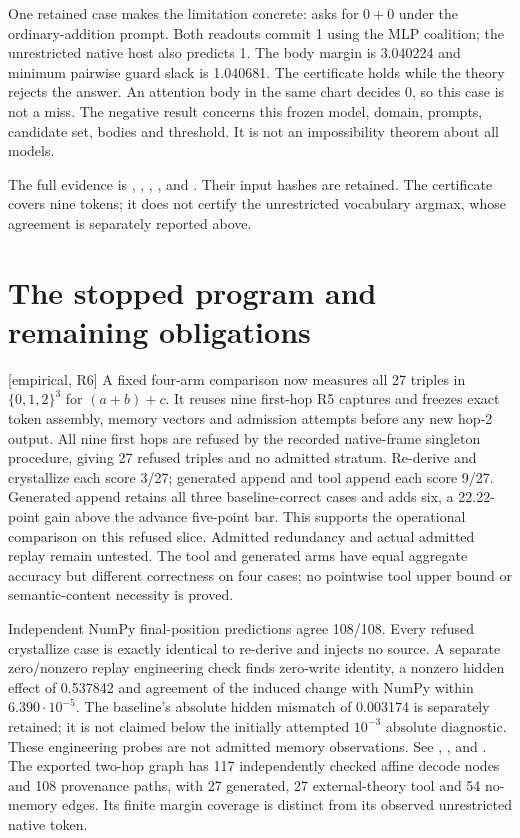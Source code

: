 \documentclass[11pt]{article}
\newcommand{\status}[1]{\textsf{[#1]}}
\begin{document}
One retained case makes the limitation concrete:  asks for
$0+0$ under the ordinary-addition prompt. Both readouts commit 1 using the
MLP coalition; the unrestricted native host also predicts 1. The body
margin is 3.040224 and minimum pairwise guard slack is 1.040681. The
certificate holds while the theory rejects the answer. An attention body
in the same chart decides 0, so this case is not a miss. The negative
result concerns this frozen model, domain, prompts, candidate set, bodies
and threshold. It is not an impossibility theorem about all models.

The full evidence is ,
, , , and
. Their input hashes are retained. The
certificate covers nine tokens; it does not certify the unrestricted
vocabulary argmax, whose agreement is separately reported above.

\section{The stopped program and remaining obligations}

\status{empirical, R6} A fixed four-arm comparison now measures all 27
triples in $\{0,1,2\}^3$ for $(a+b)+c$. It reuses nine first-hop R5 captures
and freezes exact token assembly, memory vectors and admission attempts
before any new hop-2 output. All nine first hops are refused by the recorded
native-frame singleton procedure, giving 27 refused triples and no admitted
stratum. Re-derive and crystallize each score 3/27; generated append and tool
append each score 9/27. Generated append retains all three baseline-correct
cases and adds six, a 22.22-point gain above the advance five-point bar.
This supports the operational comparison on this refused slice. Admitted
redundancy and actual admitted replay remain untested. The tool and generated
arms have equal aggregate accuracy but different correctness on four cases;
no pointwise tool upper bound or semantic-content necessity is proved.

Independent NumPy final-position predictions agree 108/108. Every refused
crystallize case is exactly identical to re-derive and injects no source.
A separate zero/nonzero replay engineering check finds zero-write identity,
a nonzero hidden effect of 0.537842 and agreement of the induced change with
NumPy within $6.390\cdot10^{-5}$. The baseline's absolute hidden mismatch
of 0.003174 is separately retained; it is not claimed below the initially
attempted $10^{-3}$ absolute diagnostic. These engineering probes are not
admitted memory observations. See
, , and
. The exported two-hop graph has 117 independently
checked affine decode nodes and 108 provenance paths, with 27 generated,
27 external-theory tool and 54 no-memory edges. Its finite margin coverage
is distinct from its observed unrestricted native token.
\end{document}
